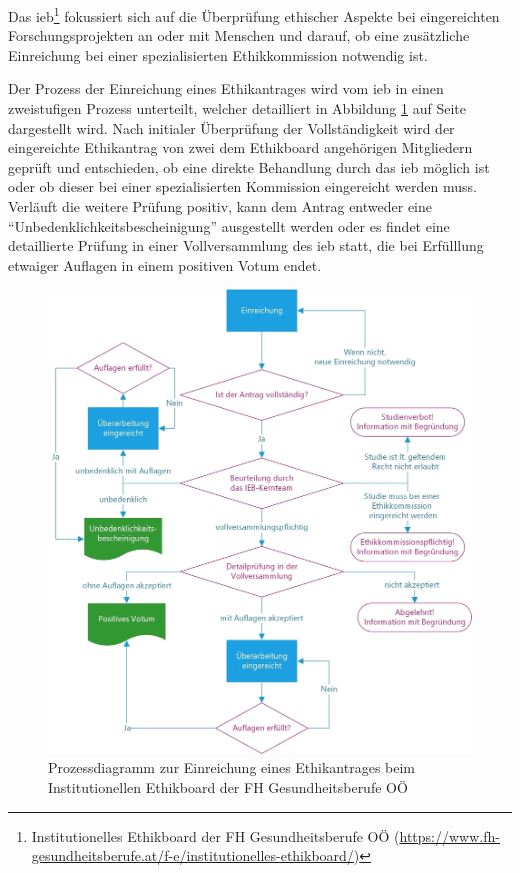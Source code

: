 \documentclass[a4paper,12pt,twoside]{scrreprt}
\begin{document}
Das \ac{ieb}\footnote{Institutionelles Ethikboard der FH Gesundheitsberufe OÖ (\url{https://www.fh-gesundheitsberufe.at/f-e/institutionelles-ethikboard/})} fokussiert sich auf die Überprüfung ethischer Aspekte bei eingereichten Forschungsprojekten an oder mit Menschen und darauf, ob eine zusätzliche Einreichung bei einer spezialisierten Ethikkommission notwendig ist. \cite{fh_gesundheitsberufe_oo_gmbh_institutionelles_2023}

\medskip

Der Prozess der Einreichung eines Ethikantrages wird vom \ac{ieb} in einen zweistufigen Prozess unterteilt, welcher detailliert in Abbildung \ref{fig:prozess-ethikantrag-ieb} auf Seite \pageref{fig:prozess-ethikantrag-ieb} dargestellt wird. Nach initialer Überprüfung der Vollständigkeit wird der eingereichte Ethikantrag von zwei dem Ethikboard angehörigen Mitgliedern geprüft und entschieden, ob eine direkte Behandlung durch das \ac{ieb} möglich ist oder ob dieser bei einer spezialisierten Kommission eingereicht werden muss. Verläuft die weitere Prüfung positiv, kann dem Antrag entweder eine \enquote{Unbedenklichkeitsbescheinigung} ausgestellt werden oder es findet eine detaillierte Prüfung in einer Vollversammlung des \ac{ieb} statt, die bei Erfülllung etwaiger Auflagen in einem positiven Votum endet. \cite{fh_gesundheitsberufe_oo_gmbh_einreichung_2023}

\begin{figure}[ht]
    \centering
    \includegraphics[scale=0.15]{thesis/images/FHGOOE_Prozess-Ethikantrag.jpg}
    \caption[Prozessdiagramm zur Einreichung eines Ethikantrages beim Institutionellen Ethikboard der FH Gesundheitsberufe OÖ]{Prozessdiagramm zur Einreichung eines Ethikantrages beim Institutionellen Ethikboard der FH Gesundheitsberufe OÖ \cite{fh_gesundheitsberufe_oo_gmbh_einreichung_2023}}
    \label{fig:prozess-ethikantrag-ieb}
\end{figure}
\end{document}
